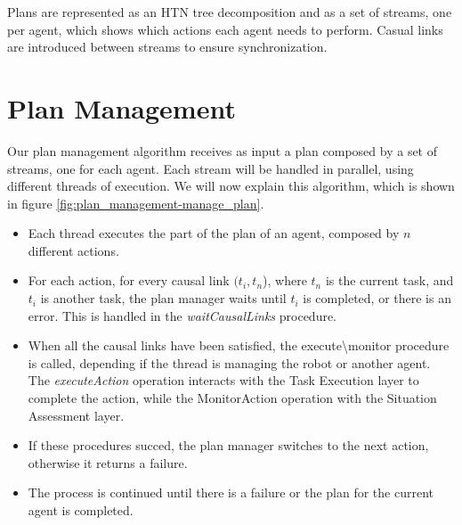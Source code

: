 Plans are represented as an HTN tree decomposition and as a set of streams, one per agent, which shows which actions each agent needs to perform. Casual links are introduced between streams to ensure synchronization.

\section{Plan Management}
\label{sec:plan_management-plan_manager}

Our plan management algorithm receives as input a plan composed by a set of streams, one for each agent. Each stream will be handled in parallel, using different threads of execution. We will now explain this algorithm, which is shown in figure \ref{fig:plan_management-manage_plan}.
\begin{itemize}
  \item Each thread executes the part of the plan of an agent, composed by $n$ different actions.
  \item For each action, for every causal link $(t_i,t_n$), where $t_n$ is the current task, and $t_i$ is another task, the plan manager waits until $t_i$ is completed, or there is an error. This is handled in the \textit{waitCausalLinks} procedure.
  \item When all the causal links have been satisfied, the execute\textbackslash monitor procedure is called, depending if the thread is managing the robot or another agent. The \textit{executeAction} operation interacts with the Task Execution layer to complete the action, while the MonitorAction operation with the Situation Assessment layer.
  \item If these procedures succed, the plan manager switches to the next action, otherwise it returns a failure.
  \item The process is continued until there is a failure or the plan for the current agent is completed.
\end{itemize} 

